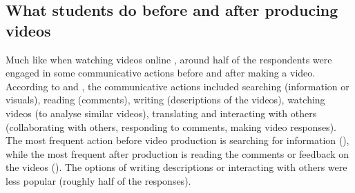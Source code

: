 \subsection{What students do before and after producing videos}

Much like when watching videos online \cite{shafirova2023},
around half of the respondents were engaged in some communicative
actions before and after making a video. According to  and ,
the communicative actions included searching (information or visuals),
reading (comments), writing (descriptions of the videos), watching
videos (to analyse similar videos), translating and interacting with
others (collaborating with others, responding to comments, making video
responses). The most frequent action before video production is
searching for information (), while the most frequent after
production is reading the comments or feedback on the videos ().
The options of writing descriptions or interacting with others were less
popular (roughly half of the responses).


